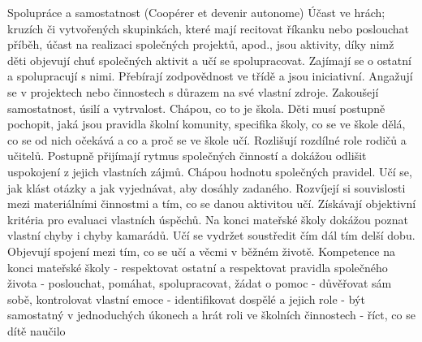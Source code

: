 		Spolupráce a samostatnost (Coopérer et devenir autonome)
		Účast ve hrách; kruzích či vytvořených skupinkách, které mají recitovat říkanku nebo poslouchat příběh, účast na realizaci společných projektů, apod., jsou aktivity, díky nimž děti objevují chuť společných aktivit a učí se spolupracovat. Zajímají se o ostatní a spolupracují s nimi. Přebírají zodpovědnost ve třídě a jsou iniciativní. Angažují se v projektech nebo činnostech s důrazem na své vlastní zdroje. Zakoušejí samostatnost, úsilí a vytrvalost. Chápou, co to je škola.
		Děti musí postupně pochopit, jaká jsou pravidla školní komunity, specifika školy, co se ve škole dělá, co se od nich očekává a co a proč se ve škole učí. Rozlišují rozdílné role rodičů a učitelů. 
		Postupně přijímají rytmus společných činností a dokážou odlišit uspokojení z jejich vlastních zájmů. Chápou hodnotu společných pravidel. Učí se, jak klást otázky a jak vyjednávat, aby dosáhly zadaného. Rozvíjejí si souvislosti mezi materiálními činnostmi a tím, co se danou aktivitou učí. Získávají objektivní kritéria pro evaluaci vlastních úspěchů. Na konci mateřské školy dokážou poznat vlastní chyby i chyby kamarádů. Učí se vydržet soustředit čím dál tím delší dobu. Objevují spojení mezi tím, co se učí a věcmi v běžném životě.
		Kompetence na konci mateřské školy
		- respektovat ostatní a respektovat pravidla společného života
		- poslouchat, pomáhat, spolupracovat, žádat o pomoc
		- důvěřovat sám sobě, kontrolovat vlastní emoce
		- identifikovat dospělé a jejich role
		- být samostatný v jednoduchých úkonech a hrát roli ve školních činnostech
		- říct, co se dítě naučilo

